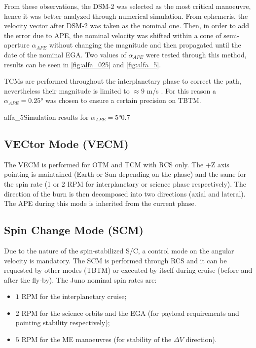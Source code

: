 From these observations, the DSM-2 was selected as the most critical manoeuvre, hence it was better analyzed through numerical simulation.
From ephemeris, the velocity vector after DSM-2 was taken as the nominal one.
Then, in order to add the error due to APE, the nominal velocity was shifted within a cone of semi-aperture $\alpha_{APE}$ without changing the magnitude and then propagated until the date of the nominal EGA.
Two values of $\alpha_{APE}$ were tested through this method, results can be seen in \autoref{fig:alfa_025} and \autoref{fig:alfa_5}.

TCMs are performed throughout the interplanetary phase to correct the path, nevertheless their magnitude is limited to $\approx 9$ m/s \cite{juno_inner}.
For this reason a $\alpha_{APE} = 0.25$° was chosen to ensure a certain precision on TBTM.

{alfa_5}{Simulation results for $\alpha_{APE} = 5$°}{0.7}

\subsection{VECtor Mode (VECM)}
\label{subsec:vec_mode}

The VECM is performed for OTM and TCM with RCS only. The +Z axis pointing is maintained (Earth or Sun depending on the phase) and the same for the spin rate (1 or 2 RPM for interplanetary or science phase respectively). The direction of the burn is then decomposed into two directions (axial and lateral). The APE during this mode is inherited from the current phase. 

\subsection{Spin Change Mode (SCM)}
\label{subsec:spin_change_mode}

Due to the nature of the spin-stabilized S/C, a control mode on the angular velocity is mandatory. The SCM is performed through RCS and it can be requested by other modes (TBTM) or executed by itself during cruise (before and after the fly-by). The Juno nominal spin rates are:
\begin{itemize}
    \item $1$ RPM for the interplanetary cruise;
    \item $2$ RPM for the science orbits and the EGA (for payload requirements and pointing stability respectively); 
    \item $5$ RPM for the ME manoeuvres (for stability of the $\Delta V$ direction). 
\end{itemize}

